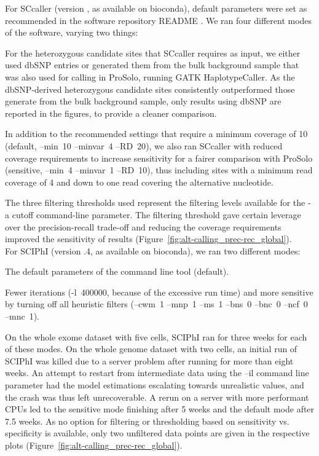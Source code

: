 \documentclass[authoryear,preprint,11pt]{scrartcl}
\begin{document}
For SCcaller (version {}, as available on bioconda), default parameters were set as recommended in the software repository README \citep{dong_sccaller_2018}.
We ran four different modes of the software, varying two things:
\begin{enumerate*}
 \item For the heterozygous candidate sites that SCcaller requires as input, we either used dbSNP \citep{sherry_dbsnp:_2001,ncbi_database_2016} entries or generated them from the bulk background sample that was also used for calling in ProSolo, running GATK HaplotypeCaller.
 As the dbSNP-derived heterozygous candidate sites consistently outperformed those generate from the bulk background sample, only results using dbSNP are reported in the figures, to provide a cleaner comparison.
 \item In addition to the recommended settings that require a minimum coverage of 10 (default, {\ttfamily --min~10 --minvar~4 --RD~20}), we also ran SCcaller with reduced coverage requirements to increase sensitivity for a fairer comparison with ProSolo (sensitive, {\ttfamily --min~4 --minvar~1 --RD~10}), thus including sites with a minimum read coverage of 4 and down to one read covering the alternative nucleotide.
\end{enumerate*}
The three filtering thresholds used represent the filtering levels available for the {\ttfamily -a cutoff} command-line parameter.
The filtering threshold gave certain leverage over the precision-recall trade-off and reducing the coverage requirements improved the sensitivity of results (Figure~\ref{fig:alt-calling_prec-rec_global}).\\

For SCIPhI (version {.4}, as available on bioconda), we ran two different modes:
\begin{enumerate*}
 \item The default parameters of the command line tool ({\ttfamily default}).
 \item Fewer iterations ({\ttfamily -l~400000}, because of the excessive run time) and more {\ttfamily sensitive} by turning off all heuristic filters ({\ttfamily --cwm~1 --mnp~1 --ms~1 --bns~0 --bnc~0 --ncf~0 --mnc~1}).
\end{enumerate*}
On the whole exome dataset with five cells, SCIPhI ran for three weeks for each of these modes.
On the whole genome dataset with two cells, an initial run of SCIPhI was killed due to a server problem after running for more than eight weeks.
An attempt to restart from intermediate data using the {\ttfamily --il} command line parameter had the model estimations escalating towards unrealistic values, and the crash was thus left unrecoverable.
A rerun on a server with more performant CPUs led to the sensitive mode finishing after 5 weeks and the default mode after 7.5 weeks.
As no option for filtering or thresholding based on sensitivity vs. specificity is available, only two unfiltered data points are given in the respective plots (Figure~\ref{fig:alt-calling_prec-rec_global}).
\end{document}
